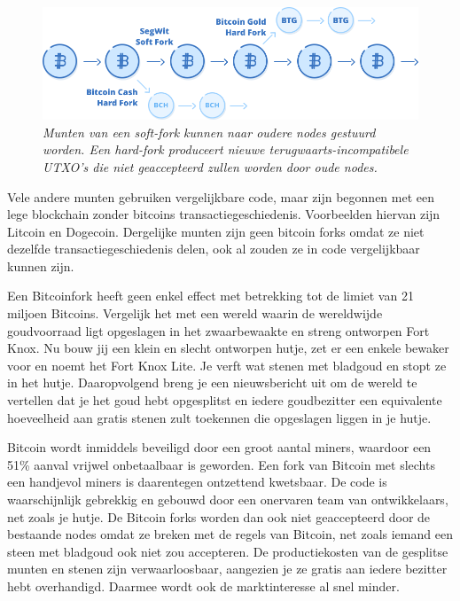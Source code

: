 \begin{figure}[h]
    \centering
    \includegraphics[width=\textwidth]{images/fig15.png}
    \caption{\footnotesize{\textit{Munten van een soft-fork kunnen naar oudere nodes gestuurd worden. Een hard-fork produceert nieuwe terugwaarts-incompatibele UTXO's die niet geaccepteerd zullen worden door oude nodes.}}}
    \label{fig15}
\end{figure}

Vele andere munten gebruiken vergelijkbare code, maar zijn begonnen met een lege blockchain zonder bitcoins transactiegeschiedenis. Voorbeelden hiervan zijn Litcoin en Dogecoin. Dergelijke munten zijn geen bitcoin forks omdat ze niet dezelfde transactiegeschiedenis delen, ook al zouden ze in code vergelijkbaar kunnen zijn. 

Een Bitcoinfork heeft geen enkel effect met betrekking tot de limiet van 21 miljoen Bitcoins. Vergelijk het met een wereld waarin de wereldwijde goudvoorraad ligt opgeslagen in het zwaarbewaakte en streng ontworpen Fort Knox. Nu bouw jij een klein en slecht ontworpen hutje, zet er een enkele bewaker voor en noemt het Fort Knox Lite. Je verft wat stenen met bladgoud en stopt ze in het hutje. Daaropvolgend breng je een nieuwsbericht uit om de wereld te vertellen dat je het goud hebt opgesplitst en iedere goudbezitter een equivalente hoeveelheid aan gratis stenen zult toekennen die opgeslagen liggen in je hutje. 

Bitcoin wordt inmiddels beveiligd door een groot aantal miners, waardoor een 51\% aanval vrijwel onbetaalbaar is geworden. Een fork van Bitcoin met slechts een handjevol miners is daarentegen ontzettend kwetsbaar. De code is waarschijnlijk gebrekkig en gebouwd door een onervaren team van ontwikkelaars, net zoals je hutje. De Bitcoin forks worden dan ook niet geaccepteerd door de bestaande nodes omdat ze breken met de regels van Bitcoin, net zoals iemand een steen met bladgoud ook niet zou accepteren. De productiekosten van de gesplitse munten en stenen zijn verwaarloosbaar, aangezien je ze gratis aan iedere bezitter hebt overhandigd. Daarmee wordt ook de marktinteresse al snel minder.

